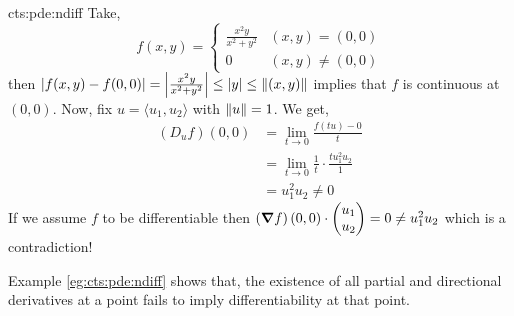 \documentclass[../Analysis-3.tex]{subfiles}
\begin{document}
\begin{Eg}{}{cts:pde:ndiff}
  Take,
  \[ f(x,y) = \begin{cases}
      \frac{x^2y}{x^2+y^2} & (x,y) = (0,0)      \\
      0                    & (x,y) \not= (0,0)
    \end{cases} \]
  then $ \left| f(x,y) - f(0,0) \right| = \left| \frac{x^2y}{x^2+y^2} \right| \leq |y| \leq \norm{(x,y)} $ implies that $ f $ is continuous at $ (0,0) $. Now, fix $ u = \langle u_1, u_2 \rangle $ with $ \norm{u} = 1 $. We get,
  \begin{align*}
    \left( D_uf \right)(0,0)
     & = \lim_{t\to 0} \frac{f(tu)- 0}{t}                        \\
     & =\lim_{t\to 0} \frac{1}{t}\cdot\frac{tu_1^2u_2}{1}        \\
     & = u_1^2u_2 \not= 0 \tag{Because, $ u $ is an unit vector}
  \end{align*}
  If we assume $ f $ to be differentiable then $ \left( \grad f \right)(0,0) \cdot \begin{pmatrix} u_1 \\ u_2  \end{pmatrix} = 0 \not= u_1^2u_2 $ which is a contradiction!
\end{Eg}

Example \ref{eg:cts:pde:ndiff} shows that, the existence of all partial and directional derivatives at a point fails to imply differentiability at that point.
\end{document}
